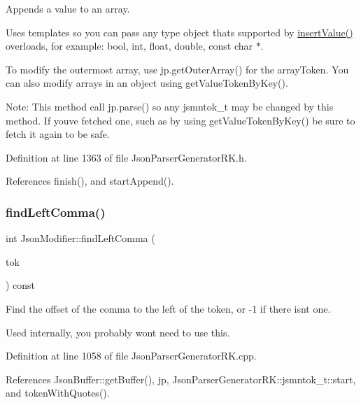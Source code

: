 Appends a value to an array. 

Uses templates so you can pass any type object that\textquotesingle{}s supported by \hyperlink{class_json_writer_ac58734c238ba7be066838591b0cc7743}{insert\+Value()} overloads, for example\+: bool, int, float, double, const char $\ast$.

To modify the outermost array, use jp.\+get\+Outer\+Array() for the array\+Token. You can also modify arrays in an object using get\+Value\+Token\+By\+Key().

Note\+: This method call jp.\+parse() so any jsmntok\+\_\+t may be changed by this method. If you\textquotesingle{}ve fetched one, such as by using get\+Value\+Token\+By\+Key() be sure to fetch it again to be safe. 

Definition at line 1363 of file Json\+Parser\+Generator\+R\+K.\+h.



References finish(), and start\+Append().

\mbox{\label{class_json_modifier_a5b67ce1041b0e40e467639de1eeeca1e}} 
\subsubsection{\texorpdfstring{find\+Left\+Comma()}{findLeftComma()}}
{\footnotesize\ttfamily int Json\+Modifier\+::find\+Left\+Comma (\begin{DoxyParamCaption}\item[{const \hyperlink{struct_json_parser_generator_r_k_1_1jsmntok__t}{Json\+Parser\+Generator\+R\+K\+::jsmntok\+\_\+t} $\ast$}]{tok }\end{DoxyParamCaption}) const}



Find the offset of the comma to the left of the token, or -\/1 if there isn\textquotesingle{}t one. 

Used internally, you probably won\textquotesingle{}t need to use this. 

Definition at line 1058 of file Json\+Parser\+Generator\+R\+K.\+cpp.



References Json\+Buffer\+::get\+Buffer(), jp, Json\+Parser\+Generator\+R\+K\+::jsmntok\+\_\+t\+::start, and token\+With\+Quotes().




